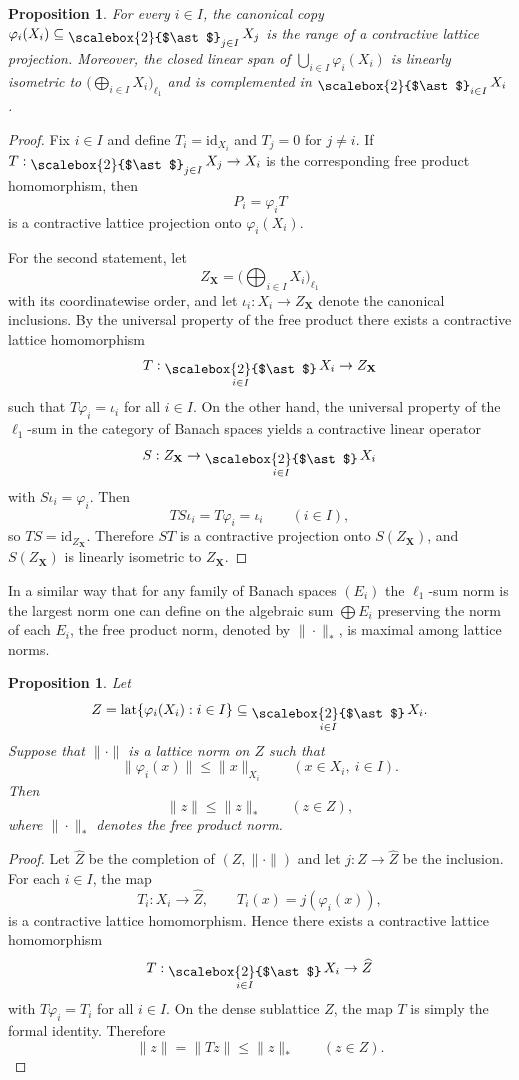 \documentclass[12pt]{amsart}
\DeclareMathOperator{\lat}{lat}
\DeclareMathOperator*{\bigfree}{\raisebox{-0.6ex}{\scalebox{2}{$\ast$}}}
\theoremstyle{plain}
\newtheorem{proposition}[theorem]{Proposition}
\theoremstyle{definition}
\begin{document}
\begin{proposition}\label{prop:complemented}
For every $i\in I$, the canonical copy $\varphi_i(X_i)\subseteq \bigfree_{j\in I}X_j$ is the range of a contractive lattice projection. Moreover, the closed linear span of $\bigcup_{i\in I}\varphi_i(X_i)$ is linearly isometric to $\big(\bigoplus_{i\in I}X_i\big)_{\ell_1}$ and is complemented in $\bigfree_{i\in I}X_i$.
\end{proposition}

\begin{proof}
Fix $i\in I$ and define $T_i=\mathrm{id}_{X_i}$ and $T_j=0$ for $j\neq i$. If $T:\bigfree_{j\in I}X_j\to X_i$ is the corresponding free product homomorphism, then
\[
P_i=\varphi_i T
\]
is a contractive lattice projection onto $\varphi_i(X_i)$.

For the second statement, let
\[
Z_\textbf{X}=\Big(\bigoplus_{i\in I}X_i\Big)_{\ell_1}
\]
with its coordinatewise order, and let $\iota_i:X_i\to Z_\textbf{X}$ denote the canonical inclusions. By the universal property of the free product there exists a contractive lattice homomorphism
\[
T:\bigfree_{i\in I}X_i\to Z_\textbf{X}
\]
such that $T\varphi_i=\iota_i$ for all $i\in I$. On the other hand, the universal property of the $\ell_1$-sum in the category of Banach spaces yields a contractive linear operator
\[
S:Z_\textbf{X}\to \bigfree_{i\in I}X_i
\]
with $S\iota_i=\varphi_i$. Then
\[
TS\iota_i=T\varphi_i=\iota_i
\qquad (i\in I),
\]
so $TS=\mathrm{id}_{Z_\textbf{X}}$. Therefore $ST$ is a contractive projection onto $S(Z_\textbf{X})$, and $S(Z_\textbf{X})$ is linearly isometric to $Z_\textbf{X}$.
\end{proof}

In a similar way that for any family of Banach spaces $(E_i)$ the $\ell_1$-sum norm is the largest norm one can define on the algebraic sum $\bigoplus E_i$ preserving the norm of each $E_i$, the free product norm, denoted by $\|\cdot\|_*$, is maximal among lattice norms.

\begin{proposition}\label{prop:maximal-norm}
Let
\[
Z=\lat\{\varphi_i(X_i):i\in I\}\subseteq \bigfree_{i\in I}X_i.
\]
Suppose that $\|\cdot\|$ is a lattice norm on $Z$ such that
\[
\|\varphi_i(x)\|\leq \|x\|_{X_i}
\qquad (x\in X_i,\ i\in I).
\]
Then
\[
\|z\|\leq \|z\|_{\ast}
\qquad (z\in Z),
\]
where $\|\cdot\|_{\ast}$ denotes the free product norm.
\end{proposition}

\begin{proof}
Let $\widehat{Z}$ be the completion of $(Z,\|\cdot\|)$ and let $j:Z\to \widehat{Z}$ be the inclusion. For each $i\in I$, the map
\[
T_i:X_i\to \widehat{Z},\qquad T_i(x)=j(\varphi_i(x)),
\]
is a contractive lattice homomorphism. Hence there exists a contractive lattice homomorphism
\[
T:\bigfree_{i\in I}X_i\to \widehat{Z}
\]
with $T\varphi_i=T_i$ for all $i\in I$. On the dense sublattice $Z$, the map $T$ is simply the formal identity. Therefore
\[
\|z\|=\|Tz\|\leq \|z\|_{\ast}
\qquad (z\in Z).
\]
\end{proof}
\end{document}
